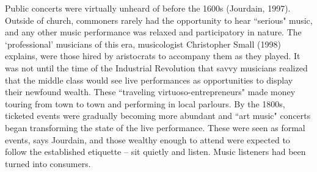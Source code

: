 Public concerts were virtually unheard of before the 1600s (Jourdain, 1997). Outside of church, commoners rarely had the opportunity to hear ``serious" music, and any other music performance was relaxed and participatory in nature. The `professional' musicians of this era, musicologist Christopher Small (1998) explains, were those hired by aristocrats to accompany them as they played. It was not until the time of the Industrial Revolution that savvy musicians realized that the middle class would see live performances as opportunities to display their newfound wealth. These ``traveling virtuoso-entrepreneurs" made money touring from town to town and performing in local parlours. By the 1800s, ticketed events were gradually becoming more abundant and ``art music" concerts began transforming the state of the live performance. These were seen as formal events, says Jourdain, and those wealthy enough to attend were expected to follow the established etiquette -- sit quietly and listen. Music listeners had been turned into consumers.


